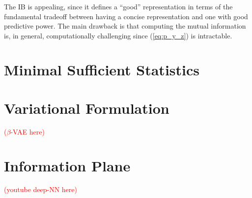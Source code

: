 \documentclass[11pt]{article}
\newcommand\myworries[1]{\textcolor{red}{(#1)}}
\begin{document}
The IB is appealing, since it defines a ``good'' representation in terms of the fundamental tradeoff between having a concise representation and one with good predictive power. The main drawback is that computing the mutual information is, in general, computationally challenging since (\ref{eq:p_y_z}) is intractable.

\section{Minimal Sufficient Statistics}

\section{Variational Formulation}


\myworries{$\beta$-VAE here}

\section{Information Plane}

\myworries{youtube deep-NN here}


 
\end{document}
